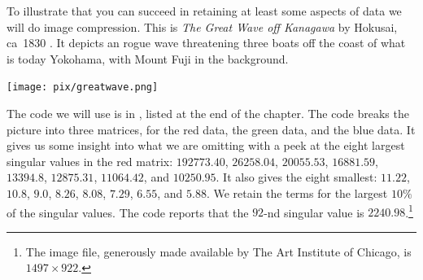 To illustrate that you can succeed in retaining at least some aspects of data
we will do image compression.
This is \textit{The Great Wave off Kanagawa} by Hokusai, ca~1830
\cite{wiki:GreatWave}.
It depicts an rogue wave threatening three boats off the coast of 
what is today Yokohama, with Mount Fuji in the background. 
\begin{center}
  \texttt{[image: pix/greatwave.png]} %
\end{center}

The code we will use is in , 
listed at the end of the chapter.
The code breaks the picture into three matrices, for the red data, the 
green data, and the blue data.
It gives us some insight into what we are omitting with  
a peek at the eight largest singular
values in the red matrix:
  $192773.40$,
  $26258.04$,
  $20055.53$,
  $16881.59$,
  $13394.8$,
  $12875.31$,
  $11064.42$, and
  $10250.95$.
It also gives the eight smallest:
  $11.22$,
  $10.8$,
  $9.0$,
  $8.26$,
  $8.08$,
  $7.29$,
  $6.55$, and
  $5.88$.
We retain the terms for the largest $10\%$ of the singular values. 
The code reports that
the $92$-nd singular value is 
$2240.98$.\footnote{%
  The image file,
  generously made available by The Art Institute of Chicago, 
  is $1497\times 922$.}



